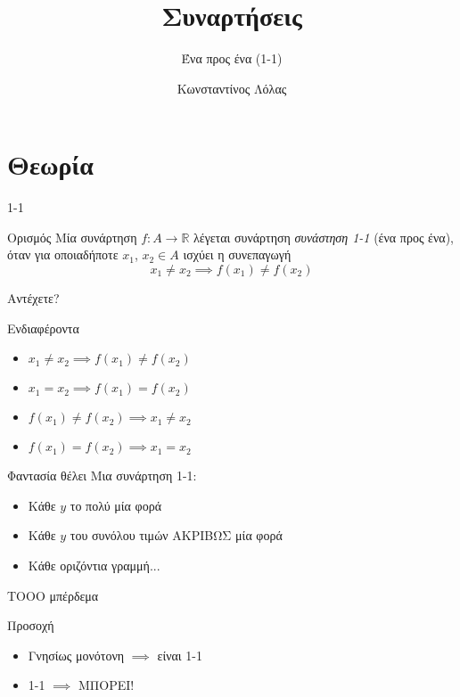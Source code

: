 \documentclass{presentation}
\title{Συναρτήσεις}
\subtitle{Ένα προς ένα (1-1)}
\author[Λόλας]{Κωνσταντίνος Λόλας }
\institute[$10^ο$ ΓΕΛ]{$10^ο$ ΓΕΛ Θεσσαλονίκης}
\begin{document}
\begin{frame}
  \titlepage
\end{frame}

\section{Θεωρία}
\begin{frame}{1-1}
  \begin{block}{Ορισμός}
    Μία συνάρτηση $f:Α\to\mathbb{R}$ λέγεται συνάρτηση \emph{συνάστηση 1-1} (ένα προς ένα), όταν για οποιαδήποτε $x_1$, $x_2\in Α$ ισχύει η συνεπαγωγή
    $$x_1\ne x_2 \implies f(x_1)\ne f(x_2)$$
  \end{block}
\end{frame}

\begin{frame}{Αντέχετε?}
  \begin{exampleblock}{Ενδιαφέροντα}
    \begin{itemize}
      \item $x_1\ne x_2 \implies f(x_1)\ne f(x_2)$
      \item $x_1= x_2 \implies f(x_1)= f(x_2)$
      \item $f(x_1)\ne f(x_2) \implies x_1\ne x_2$
      \item $f(x_1)= f(x_2) \implies x_1= x_2$
    \end{itemize}
  \end{exampleblock}
\end{frame}

\begin{frame}{Φαντασία θέλει}
  Μια συνάρτηση 1-1:
  \begin{itemize}[<+-|alert@+>]
    \item Κάθε $y$ το πολύ μία φορά
    \item Κάθε $y$ του συνόλου τιμών ΑΚΡΙΒΩΣ μία φορά
    \item Κάθε οριζόντια γραμμή...
  \end{itemize}
\end{frame}

\begin{frame}{ΤΟΟΟ μπέρδεμα}
  \begin{alertblock}{Προσοχή}
    \begin{itemize}
      \item Γνησίως μονότονη $\implies$ \pause είναι 1-1 \pause
      \item  1-1 $\implies$ \pause ΜΠΟΡΕΙ!
    \end{itemize}
  \end{alertblock}
\end{frame}
\end{document}
